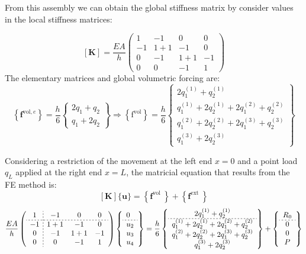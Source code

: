 \documentclass[spanish,a4paper,12pt]{article}
\begin{document}
From this assembly we can obtain the global stiffness matrix by consider values in the local stiffness matrices:

$$
[\mathbf{K}]=\frac{EA}{h}\left(\begin{array}{cccc}{1} & {-1} & {0} & {0} \\ {-1} & {1+1} & {-1} & {0} \\ {0} & {-1} & {1+1} & {-1} \\ {0} & {0} & {-1} & {1}\end{array}\right)
$$
The elementary matrices and global volumetric forcing are:
$$\left\{\mathbf{f}^{\mathrm{vol}, e}\right\}=\frac{h}{6}\left\{\begin{array}{l}{2q_1+q_2} \\ {q_1 + 2q_2}\end{array}\right\}
\Rightarrow\left\{\mathrm{f}^{\mathrm{vol}}\right\}=\frac{h}{6}\left\{\begin{array}{c}{2q_1^{(1)}+q_2^{(1)}} \\ {q_1^{(1)} + 2q_2^{(1)} + 2q_1^{(2)}+q_2^{(2)}} \\ {q_1^{(2)} + 2q_2^{(2)} + 2q_1^{(3)}+q_2^{(3)}}  \\ {q_1^{(3)} + 2q_2^{(3)}}\end{array}\right\}
$$

Considering a restriction of the movement at the left end $x=0$ and a point load $q_L$ applied at the right end $x=L$, the matricial equation that results from the FE method is:
$$[\mathbf{K}]\{\mathbf{u}\}=\left\{\mathbf{f}^{\text {vol }}\right\}+\left\{\mathbf{f}^{\text {ext }}\right\}
$$
\begin{equation}\label{sistema}
\frac{EA}{h}\left(\begin{array}{c;{2pt/2pt}ccc}{1} & {-1} & {0} & {0} \\ 
\hdashline[2pt/2pt]
{-1} & {1+1} & {-1} & {0} \\ {0} & {-1} & {1+1} & {-1} \\ {0} & {0} & {-1} & {1}\end{array}\right)
\left\{\begin{array}{l}0\\
\hdashline[2pt/2pt]
u_2 \\ u_{3} \\ u_{4}\end{array}
\right\}=
\frac{h}{6}\left\{\begin{array}{c}{2q_1^{(1)}+q_2^{(1)}} \\ 
\hdashline[2pt/2pt]
{q_1^{(1)} + 2q_2^{(1)} + 2q_1^{(2)}+q_2^{(2)}} \\ {q_1^{(2)} + 2q_2^{(2)} + 2q_1^{(3)}+q_2^{(3)}}  \\ {q_1^{(3)} + 2q_2^{(3)}}\end{array}\right\}
+\left\{\begin{array}{c} R_0 \\
\hdashline[2pt/2pt]
{0} \\ {0} \\ {P}\end{array}\right\}
\end{equation}
\end{document}
